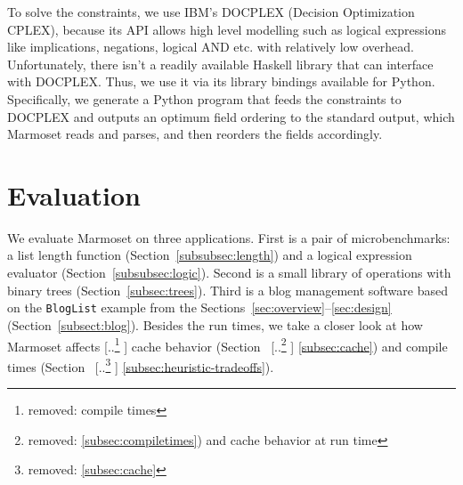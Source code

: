 \documentclass[acmsmall,review,anonymous]{acmart}\settopmatter{printfolios=true,printccs=false,printacmref=false}
\newcommand{\system}{{\sc Marmoset}\xspace}
\providecommand{\DIFaddtex}[1]{{\protect\color{blue} \sf #1}} %
\providecommand{\DIFdeltex}[1]{{\protect\color{red} [..\footnote{removed: #1} ]}} %
\providecommand{\DIFaddbegin}{} %
\providecommand{\DIFaddend}{} %
\providecommand{\DIFdelbegin}{} %
\providecommand{\DIFdelend}{} %
\providecommand{\DIFadd}[1]{\texorpdfstring{\DIFaddtex{#1}}{#1}} %
\providecommand{\DIFdel}[1]{\texorpdfstring{\DIFdeltex{#1}}{}} %
\newcommand{\DIFscaledelfig}{0.5}
\newlength{\DIFdelgraphicswidth} %
\newlength{\DIFdelgraphicsheight} %
\newcommand{\DIFaddincludegraphics}[2][]{{\color{blue}\fbox{\DIFOincludegraphics[#1]{#2}}}} %
\newcommand{\DIFdelincludegraphics}[2][]{%
\sbox{\DIFdelgraphicsbox}{\DIFOincludegraphics[#1]{#2}}%
\settoboxwidth{\DIFdelgraphicswidth}{\DIFdelgraphicsbox} %
\settoboxtotalheight{\DIFdelgraphicsheight}{\DIFdelgraphicsbox} %
\scalebox{\DIFscaledelfig}{%
\parbox[b]{\DIFdelgraphicswidth}{\usebox{\DIFdelgraphicsbox}\\[-\baselineskip] \rule{\DIFdelgraphicswidth}{0em}}\llap{\resizebox{\DIFdelgraphicswidth}{\DIFdelgraphicsheight}{%
\setlength{\unitlength}{\DIFdelgraphicswidth}%
\begin{picture}(1,1)%
\thicklines\linethickness{2pt} %
{\color[rgb]{1,0,0}\put(0,0){\framebox(1,1){}}}%
{\color[rgb]{1,0,0}\put(0,0){\line( 1,1){1}}}%
{\color[rgb]{1,0,0}\put(0,1){\line(1,-1){1}}}%
\end{picture}%
}\hspace*{3pt}}} %
} %
\DeclareRobustCommand{\DIFaddbegin}{\DIFOaddbegin \let\includegraphics\DIFaddincludegraphics} %
\DeclareRobustCommand{\DIFaddend}{\DIFOaddend \let\includegraphics\DIFOincludegraphics} %
\DeclareRobustCommand{\DIFdelbegin}{\DIFOdelbegin \let\includegraphics\DIFdelincludegraphics} %
\DeclareRobustCommand{\DIFdelend}{\DIFOaddend \let\includegraphics\DIFOincludegraphics} %
\begin{document}
To solve the constraints, we use IBM's DOCPLEX (Decision Optimization CPLEX),
because its API allows high level modelling such as logical expressions like implications, negations, logical AND etc. with relatively low overhead. 
Unfortunately, there isn't a readily available Haskell library that can interface with DOCPLEX.
Thus, we use it via its library bindings available for Python.
Specifically, we generate a Python program that feeds the constraints to DOCPLEX and
outputs an optimum field ordering to the standard output,
which \system{} reads and parses, and then reorders the fields accordingly.




















































 \section{Evaluation}

We evaluate \system on three applications.
First is a pair of microbenchmarks: a list length function
(Section~\ref{subsubsec:length}) and a logical expression evaluator (Section~\ref{subsubsec:logic}).
Second is a small library of operations with binary trees (Section~\ref{subsec:trees}).
Third is a blog management software based on the \lstinline|BlogList| example from the
Sections~\ref{sec:overview}--\ref{sec:design} (Section~\ref{subsect:blog}).
Besides the run times, we take a closer look at how \system affects
\DIFdelbegin \DIFdel{compile
times }\DIFdelend \DIFaddbegin \DIFadd{cache behavior }\DIFaddend (Section~\DIFdelbegin \DIFdel{\ref{subsec:compiletimes}) and cache behavior at run time }\DIFdelend \DIFaddbegin \DIFadd{\ref{subsec:cache}) and compile times }\DIFaddend (Section~\DIFdelbegin \DIFdel{\ref{subsec:cache}}\DIFdelend \DIFaddbegin \DIFadd{\ref{subsec:heuristic-tradeoffs}}\DIFaddend ). 
\end{document}

